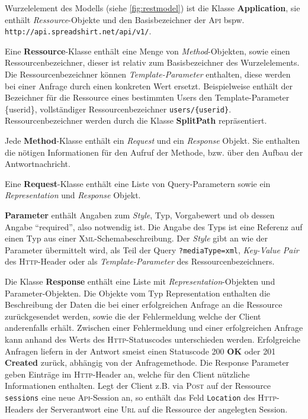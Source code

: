 Wurzelelement des Modells (siehe \cref{fig:restmodel}) ist die Klasse \textbf{Application}, sie enthält \emph{Ressource}-Objekte und den Basisbezeichner der \textsc{Api} bspw. \texttt{\small http://api.spreadshirt.net/api/v1/}. 

Eine \textbf{Ressource}-Klasse enthält eine Menge von \emph{Method}-Objekten, sowie einen Ressourcenbezeichner, dieser ist relativ zum Basisbezeichner des Wurzelelements. Die Ressourcenbezeichner können \emph{Template-Parameter} enthalten, diese werden bei einer Anfrage durch einen konkreten Wert ersetzt. Beispielweise enthält der Bezeichner für die Ressource eines bestimmten Users den Template-Parameter \{userid\}, vollständiger Ressourcenbezeichner \texttt{users/\{userid\}}. Ressourcenbezeichner werden durch die Klasse \textbf{SplitPath} repräsentiert. 

Jede \textbf{Method}-Klasse enthält ein \emph{Request} und ein \emph{Response} Objekt. Sie enthalten die nötigen Informationen für den Aufruf der Methode, bzw. über den Aufbau der Antwortnachricht.

Eine \textbf{Request}-Klasse enthält eine Liste von Query-Parametern sowie ein \emph{Representation} und \emph{Response} Objekt.

\textbf{Parameter} enthält Angaben zum \emph{Style}, Typ, Vorgabewert und ob dessen Angabe \enquote{required}, also notwendig ist. Die Angabe des Typs ist eine Referenz auf einen Typ aus einer \textsc{Xml}-Schemabeschreibung. Der \emph{Style} gibt an wie der Parameter übermittelt wird, als Teil der Query \texttt{?mediaType=xml}, \emph{Key-Value Pair} des \textsc{Http}-Header oder als \emph{Template-Parameter} des Ressourcenbezeichners. 

Die Klasse \textbf{Response} enthält eine Liste mit \emph{Representation}-Objekten und Parameter-Objekten. Die Objekte vom Typ Representation enthalten die Beschreibung der Daten die bei einer erfolgreichen Anfrage an die Ressource zurückgesendet werden, sowie die der Fehlermeldung welche der Client anderenfalls erhält. Zwischen einer Fehlermeldung und einer erfolgreichen Anfrage kann anhand des Werts des \textsc{Http}-Statuscodes unterschieden werden. Erfolgreiche Anfragen liefern in der Antwort smeist einen Statuscode 200 \textbf{OK} oder 201 \textbf{Created} zurück, abhängig von der Anfragemethode. Die Response Parameter geben Einträge im \textsc{Http}-Header an, welche für den Client nützliche Informationen enthalten. Legt der Client z.B. via \textsc{Post} auf der Ressource \texttt{sessions} eine neue \textsc{Api}-Session an, so enthält das Feld \texttt{Location} des \textsc{Http}-Headers der Serverantwort eine \textsc{Url} auf die Ressource der angelegten Session.

